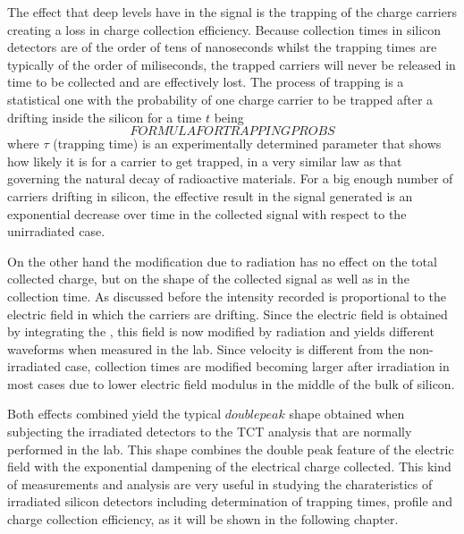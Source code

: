 The effect that deep levels have in the signal is the trapping of the charge carriers creating a loss in charge collection efficiency. Because collection times in silicon detectors are of the order of tens of nanoseconds whilst the trapping times are typically of the order of miliseconds, the trapped carriers will never be released in time to be collected and are effectively lost. The process of trapping is a statistical one with the probability of one charge carrier to be trapped after a drifting inside the silicon for a time $t$ being  \[FORMULA FOR TRAPPING PROBS\] where $\tau$ (trapping time) is an experimentally determined parameter that shows how likely it is for a carrier to get trapped, in a very similar law as that governing the natural decay of radioactive materials. For a big enough number of carriers drifting in silicon, the effective result in the signal generated is an exponential decrease over time in the collected signal with respect to the unirradiated case. 

On the other hand the \neff modification due to radiation has no effect on the total collected charge, but on the shape of the collected signal as well as in the collection time. As discussed before the intensity recorded is proportional to the electric field in which the carriers are drifting. Since the electric field is obtained by integrating the \neff, this field is now modified by radiation and yields different waveforms when measured in the lab. Since velocity is different from the non-irradiated case, collection times are modified becoming larger after irradiation in most cases due to lower electric field modulus in the middle of the bulk of silicon. 

Both effects combined yield the typical $double peak$ shape obtained when subjecting the irradiated detectors to the TCT analysis that are normally performed in the lab. This shape combines the double peak feature of the electric field with the exponential dampening of the electrical charge collected. This kind of measurements and analysis are very useful in studying the charateristics of irradiated silicon detectors including determination of trapping times, \neff profile and charge collection efficiency, as it will be shown in the following chapter.






















